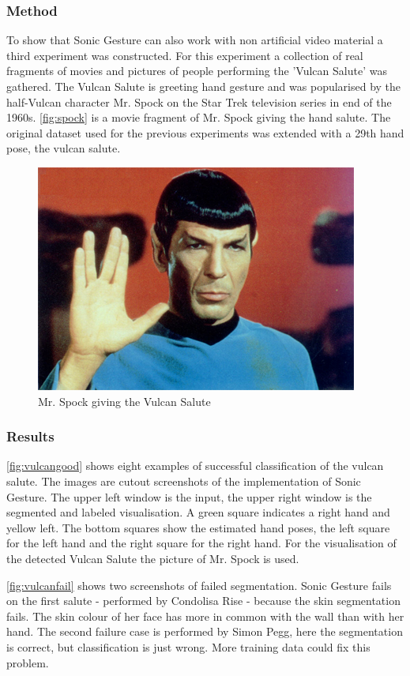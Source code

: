 \subsubsection{Method}
To show that Sonic Gesture can also work with non artificial video material a third experiment was constructed. For this experiment a collection of real fragments of movies and pictures of people performing the 'Vulcan Salute' was gathered. The Vulcan Salute is greeting hand gesture and was popularised by the half-Vulcan character Mr. Spock on the Star Trek television series in end of the 1960s. \autoref{fig:spock} is a movie fragment of Mr. Spock giving the hand salute. The original dataset used for the previous experiments was extended with a 29th hand pose, the vulcan salute. 

\begin{figure}[htbp]
\centering{}
\includegraphics[width=0.6\linewidth]{figures/spock/salute.png}
\caption{Mr. Spock giving the Vulcan Salute}
\label{fig:spock}
\end{figure}


\subsubsection{Results}
\autoref{fig:vulcangood} shows eight examples of successful classification of the vulcan salute. The images are cutout screenshots of the implementation of Sonic Gesture. The upper left window is the input, the upper right window is the segmented and labeled visualisation. A green square indicates a right hand and yellow left. The bottom squares show the estimated hand poses, the left square for the left hand and the right square for the right hand. For the visualisation of the detected Vulcan Salute the picture of Mr. Spock is used.

\autoref{fig:vulcanfail} shows two screenshots of failed segmentation. Sonic Gesture fails on the first salute - performed by Condolisa Rise - because the skin segmentation fails. The skin colour of her face has more in common with the wall than with her hand. The second failure case is performed by Simon Pegg, here the segmentation is correct, but classification is just wrong. More training data could fix this problem.

